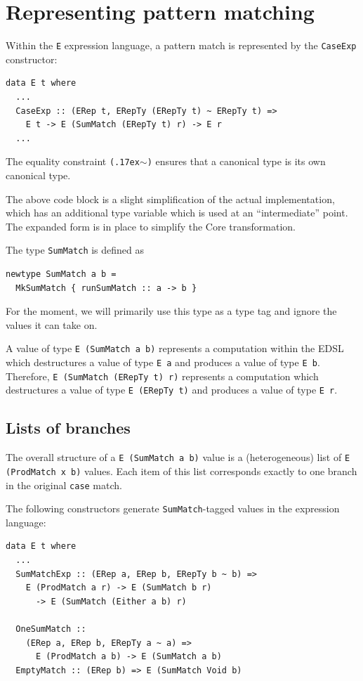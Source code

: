 \documentclass[runningheads, a4paper]{llncs}
\newcommand{\typeeqb}{\raise.17ex\hbox{$\scriptstyle\mathtt{\sim}$}}
\newcommand{\ttt}{\texttt}
\begin{document}
\section{Representing pattern matching}
\label{sec:PatRep}

Within the \ttt{E} expression language, a pattern match is represented by the
\ttt{CaseExp} constructor:
\begin{lstlisting}
data E t where
  ...
  CaseExp :: (ERep t, ERepTy (ERepTy t) ~ ERepTy t) =>
    E t -> E (SumMatch (ERepTy t) r) -> E r
  ...
\end{lstlisting}

\noindent The equality constraint \ttt{(\typeeqb)} ensures that a canonical type is its own canonical type.

The above code block is a slight simplification of the actual implementation,
which has an additional type variable which is used at an ``intermediate'' point.
The expanded form is in place to simplify the Core transformation.

The type \ttt{SumMatch} is defined as

\begin{lstlisting}
newtype SumMatch a b =
  MkSumMatch { runSumMatch :: a -> b }
\end{lstlisting}

\noindent For the moment, we will primarily use this type as a type tag and ignore
the values it can take on.

A value of type \ttt{E (SumMatch a b)} represents a computation within the EDSL
which destructures a value of type \ttt{E a} and produces a value of type \ttt{E b}.
Therefore, \ttt{E (SumMatch (ERepTy t) r)} represents a computation which destructures
a value of type \ttt{E (ERepTy t)} and produces a value of type \ttt{E r}.



\subsection{Lists of branches}

The overall structure of a \ttt{E (SumMatch a b)} value is a (heterogeneous)
list of \ttt{E (ProdMatch x b)} values.  Each item of this list corresponds
exactly to one branch in the original \ttt{case} match.

The following constructors generate \ttt{SumMatch}-tagged values in the
expression language:

\begin{lstlisting}
data E t where
  ...
  SumMatchExp :: (ERep a, ERep b, ERepTy b ~ b) =>
    E (ProdMatch a r) -> E (SumMatch b r)
      -> E (SumMatch (Either a b) r)

  OneSumMatch ::
    (ERep a, ERep b, ERepTy a ~ a) =>
      E (ProdMatch a b) -> E (SumMatch a b)
  EmptyMatch :: (ERep b) => E (SumMatch Void b)
\end{lstlisting}
\end{document}

